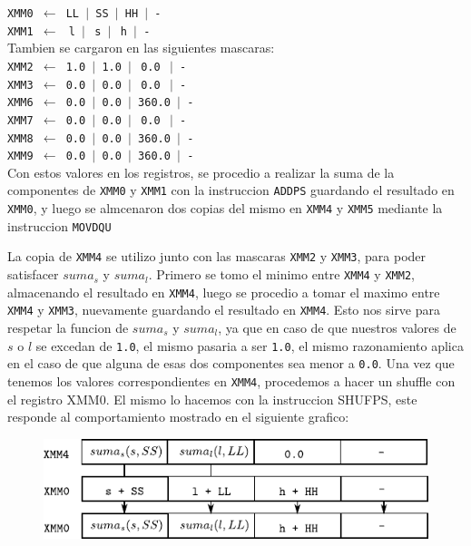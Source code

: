 \noindent
\texttt{XMM0 $\gets$   LL  $\vert$   SS  $\vert$   HH  $\vert$ - }\\
\texttt{XMM1 $\gets\ $   l  $\vert\ $   s  $\vert\ $   h  $\vert$ - }\\

Tambien se cargaron en las siguientes mascaras:\\

\noindent
\texttt{XMM2 $\gets$  1.0  $\vert$  1.0  $\vert\ $  0.0  $\ \vert$ - }\\
\texttt{XMM3 $\gets$  0.0  $\vert$  0.0  $\vert\ $  0.0  $\ \vert$ - }\\
\texttt{XMM6 $\gets$  0.0  $\vert$  0.0  $\vert$  360.0  $\vert$ - }\\
\texttt{XMM7 $\gets$  0.0  $\vert$  0.0  $\vert\ $  0.0  $\ \vert$ - }\\
\texttt{XMM8 $\gets$  0.0  $\vert$  0.0  $\vert$  360.0  $\vert$ - }\\
\texttt{XMM9 $\gets$  0.0  $\vert$  0.0  $\vert$  360.0  $\vert$ - }\\

Con estos valores en los registros, se procedio a realizar la suma de la componentes de \texttt{XMM0} y \texttt{XMM1} con la instruccion \texttt{ADDPS} guardando el resultado en \texttt{XMM0}, y luego se almcenaron dos copias del mismo en \texttt{XMM4} y \texttt{XMM5} mediante la instruccion \texttt{MOVDQU}

La copia de \texttt{XMM4} se utilizo junto con las mascaras \texttt{XMM2} y \texttt{XMM3}, para poder satisfacer $suma_s$ y $suma_l$. Primero se tomo el minimo entre \texttt{XMM4} y \texttt{XMM2}, almacenando el resultado en \texttt{XMM4}, luego se procedio a tomar el maximo entre \texttt{XMM4} y \texttt{XMM3}, nuevamente guardando el resultado en \texttt{XMM4}. Esto nos sirve para respetar la funcion de $suma_s$ y $suma_l$, ya que en caso de que nuestros valores de $s$ o $l$ se excedan de \texttt{1.0}, el mismo pasaria a ser \texttt{1.0}, el mismo razonamiento aplica en el caso de que alguna de esas dos componentes sea menor a \texttt{0.0}.
\newpage
Una vez que tenemos los valores correspondientes en \texttt{XMM4}, procedemos a hacer un shuffle con el registro XMM0. El mismo lo hacemos con la instruccion \textsc{SHUFPS}, este responde al comportamiento mostrado en el siguiente grafico:

\begin{figure}[!h]
	\centering
	\includegraphics[scale=1.25]{images/HSLASM1_0}
\end{figure}


